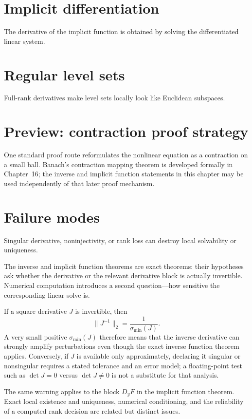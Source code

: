 \section{Implicit differentiation}
The derivative of the implicit function is obtained by solving the differentiated linear system.

\section{Regular level sets}
Full-rank derivatives make level sets locally look like Euclidean subspaces.

\section{Preview: contraction proof strategy}
One standard proof route reformulates the nonlinear equation as a contraction on a small ball. Banach's contraction mapping theorem is developed formally in Chapter~16; the inverse and implicit function statements in this chapter may be used independently of that later proof mechanism.

\section{Failure modes}
Singular derivative, noninjectivity, or rank loss can destroy local solvability or uniqueness.

\begin{remark}
The inverse and implicit function theorems are exact theorems: their hypotheses
ask whether the derivative or the relevant derivative block is actually
invertible.  Numerical computation introduces a second question---how
sensitive the corresponding linear solve is.

If a square derivative \(J\) is invertible, then
\[
\|J^{-1}\|_2=\frac{1}{\sigma_{\min}(J)}.
\]
A very small positive \(\sigma_{\min}(J)\) therefore means that the inverse
derivative can strongly amplify perturbations even though the exact inverse
function theorem applies.  Conversely, if \(J\) is available only
approximately, declaring it singular or nonsingular requires a stated
tolerance and an error model; a floating-point test such as
\(\det J=0\) versus \(\det J\ne0\) is not a substitute for that analysis.

The same warning applies to the block \(D_yF\) in the implicit function
theorem.  Exact local existence and uniqueness, numerical conditioning, and
the reliability of a computed rank decision are related but distinct issues.
\end{remark}


